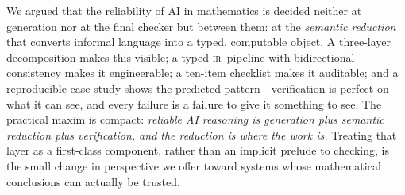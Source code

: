 \documentclass[11pt,a4paper]{article}
\newcommand{\ir}{\textsc{ir}\xspace}
\theoremstyle{plain}
\theoremstyle{definition}
\theoremstyle{remark}
\begin{document}
We argued that the reliability of AI in mathematics is decided neither at
generation nor at the final checker but between them: at the
\emph{semantic reduction} that converts informal language into a typed,
computable object. A three-layer decomposition makes this visible; a
typed-\ir\ pipeline with bidirectional consistency makes it engineerable;
a ten-item checklist makes it auditable; and a reproducible case study
shows the predicted pattern---verification is perfect on what it can see,
and every failure is a failure to give it something to see. The practical
maxim is compact: \emph{reliable AI reasoning is generation plus semantic
reduction plus verification, and the reduction is where the work is.}
Treating that layer as a first-class component, rather than an implicit
prelude to checking, is the small change in perspective we offer toward
systems whose mathematical conclusions can actually be trusted.


\end{document}
